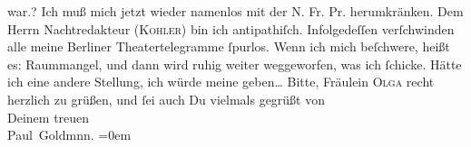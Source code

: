 \begin{ledgroupsized}[t]{13cm}
{{{                  war.}}}\label{K_L03066-4h}?\pend
           \pstart
           Ich muß mich jetzt wieder namenlos {\pb}mit der N. Fr. Pr. herumkränken. Dem Herrn Nachtredakteur (\textsc{Kohler}) bin ich antipathiſch. Infolgedeſſen verſchwinden alle meine Berliner Theatertelegramme ſpurlos. Wenn ich mich beſchwere,
               heißt es: Raummangel, und dann wird ruhig weiter weggeworfen, was ich ſchicke. Hätte
               ich eine andere Stellung, ich würde meine \label{K_L03066-5v}\label{K_L03066-5h} geben{\dots}\pend
           \pstart
           Bitte, Fräulein \textsc{Olga} recht herzlich zu grüßen, und ſei auch Du vielmals gegrüßt von {\\[\baselineskip]}Deinem
               treuen {\\[\baselineskip]}\spacefill\mbox{Paul Goldmnn.}\pend
           \leftskip=0em{}
         
         \endnumbering{}\end{ledgroupsized}  \newcommand{\dateiname}{L03066}\newcommand{\titel}{Paul Goldmann an Arthur Schnitzler, 13. 5. [1901]}\newcommand{\editorInnen}{Martin Anton Müller und Laura Untner}
      